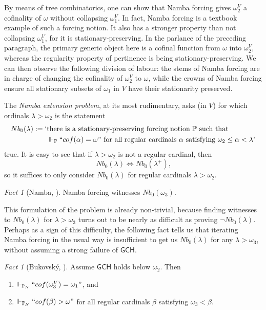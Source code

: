 \documentclass[12pt, twoside]{memoir}
\numberwithin{equation}{section}
\theoremstyle{definition}
\theoremstyle{remark}
\newtheorem{fact}[thm]{Fact}
\theoremstyle{definition}
\theoremstyle{definition}
\theoremstyle{definition}
\theoremstyle{remark}
\begin{document}
By means of tree combinatorics, one can show that Namba forcing gives $\omega_2^V$ a cofinality of $\omega$ without collapsing $\omega_1^V$. In fact, Namba forcing is a textbook example of such a forcing notion. It also has a stronger property than not collapsing $\omega_1^V$, for it is stationary-preserving. In the parlance of the preceding paragraph, the primary generic object here is a cofinal function from $\omega$ into $\omega_2^V$, whereas the regularity property of pertinence is being stationary-preserving. We can then observe the following division of labour: the stems of Namba forcing are in charge of changing the cofinality of $\omega_2^V$ to $\omega$, while the crowns of Namba forcing ensure all stationary subsets of $\omega_1$ in $V$ have their stationarity preserved.

The \textit{Namba extension problem}, at its most rudimentary, asks (in $V$) for which ordinals $\lambda > \omega_2$ is the statement
\begin{align*}
    Nb_0(\lambda) := \text{`} & \text{there is a stationary-preserving forcing notion } \mathbb{P} \text{ such that} \\ 
    & \Vdash_{\mathbb{P}} ``cof(\alpha) = \omega" \text{ for all regular cardinals } \alpha \text{ satisfying } \omega_2 \leq \alpha < \lambda \text{'}
\end{align*} 
true. It is easy to see that if $\lambda > \omega_2$ is not a regular cardinal, then 
\begin{equation*}
    Nb_0(\lambda) \iff Nb_0(\lambda^+) \text{,}
\end{equation*}
so it suffices to only consider $Nb_0(\lambda)$ for regular cardinals $\lambda > \omega_2$.

\begin{fact}[Namba, \cite{namba}]
Namba forcing witnesses $Nb_0(\omega_3)$.
\end{fact}

This formulation of the problem is already non-trivial, because finding witnesses to $Nb_0(\lambda)$ for $\lambda > \omega_3$ turns out to be nearly as difficult as proving $\neg Nb_0(\lambda)$. Perhaps as a sign of this difficulty, the following fact tells us that iterating Namba forcing in the usual way is insufficient to get us $Nb_0(\lambda)$ for any $\lambda > \omega_3$, without assuming a strong failure of $\mathsf{GCH}$. 

\begin{fact}[Bukovsk\'{y}, \cite{bukovsky}]\label{fact26}
Assume $\mathsf{GCH}$ holds below $\omega_2$. Then 
\begin{enumerate}[label=(\arabic*)]
    \item\label{fact261} $\Vdash_{\mathbb{P}_{N}} ``cof(\omega_3^V) = \omega_1"$, and
    \item $\Vdash_{\mathbb{P}_{N}} ``cof(\beta) > \omega"$ for all regular cardinals $\beta$ satisfying $\omega_3 < \beta$.
\end{enumerate}
\end{fact}
\end{document}
